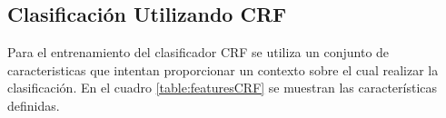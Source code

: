 \documentclass[runningheads,a4paper]{llncs}
\begin{document}
\subsection{Clasificación Utilizando CRF}


Para el entrenamiento del clasificador CRF se utiliza un conjunto de caracteristicas que intentan proporcionar un contexto sobre el cual realizar la clasificación. En el cuadro \ref{table:featuresCRF} se muestran las características definidas.
\end{document}
